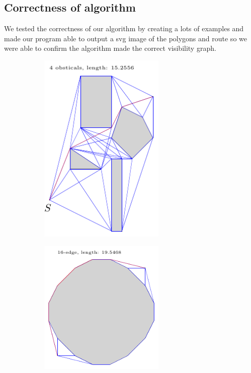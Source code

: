\subsection{Correctness of algorithm}
We tested the correctness of our algorithm by creating a lots of examples and
made our program able to output a svg image of the polygons and route so we
were able to confirm the algorithm made the correct visibility graph.
\begin{figure}[H]
	\caption{Examples of figures for correctness}
	\begin{subfigure}{.5\textwidth}
		\includegraphics[width=6cm]{figures/correctness1.pdf}
		\caption{}
		\label{fig:correctness_1}
	\end{subfigure}
	\begin{subfigure}{.5\textwidth}
		\includegraphics[width=6cm]{figures/correctness2.pdf}
		\caption{}
		\label{fig:correctness_2}
	\end{subfigure}
\end{figure}

